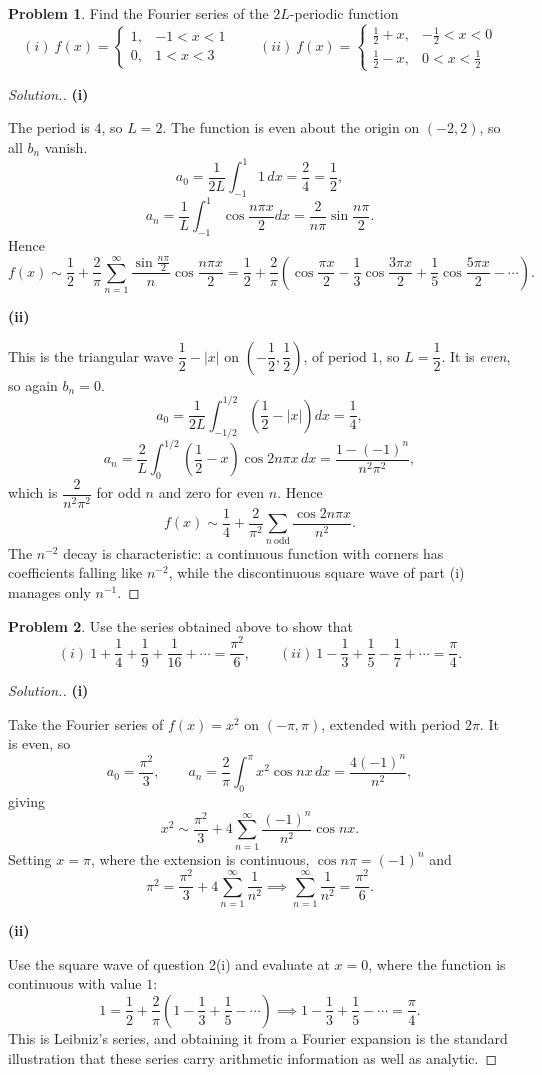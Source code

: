 \documentclass[11pt,a4paper]{article}
\theoremstyle{definition}
\newtheorem{problemx}{Problem}[subsection]
\newenvironment{problem}{\begin{problemx}}{\end{problemx}}
\newenvironment{solution}
  {\renewcommand{\qedsymbol}{}\begin{proof}[\textit{Solution}.]}
  {\end{proof}}
\newcommand{\subhead}[1]{%
  \par\medskip\noindent\textbf{#1}\par\nobreak\smallskip}
\begin{document}
\begin{problem}
Find the Fourier series of the $2L$-periodic function
\[(i)\ f(x) = \begin{cases}1, & -1<x<1\\ 0, & 1<x<3\end{cases}
\qquad
(ii)\ f(x) = \begin{cases}\frac12+x, & -\frac12<x<0\\
\frac12-x, & 0<x<\frac12\end{cases}\]
\end{problem}
\begin{solution}
\subhead{(i)}
The period is $4$, so $L = 2$. The function is even about the origin on
$(-2,2)$, so all $b_n$ vanish.
\[a_0 = \frac{1}{2L}\int_{-1}^{1}1\,dx = \frac{2}{4} = \frac12 ,\]
\[a_n = \frac1L\int_{-1}^{1}\cos\frac{n\pi x}{2}dx
= \frac{2}{n\pi}\sin\frac{n\pi}{2}.\]
Hence
\[f(x)\sim\frac12 + \frac{2}{\pi}\sum_{n=1}^{\infty}
\frac{\sin\frac{n\pi}{2}}{n}\cos\frac{n\pi x}{2}
= \frac12 + \frac{2}{\pi}\left(\cos\frac{\pi x}{2}
- \frac13\cos\frac{3\pi x}{2} + \frac15\cos\frac{5\pi x}{2} - \cdots\right).\]

\subhead{(ii)}
This is the triangular wave $\dfrac12-\left|x\right|$ on
$\left(-\dfrac12,\dfrac12\right)$, of period $1$, so $L = \dfrac12$. It is
\emph{even}, so again $b_n = 0$.
\[a_0 = \frac{1}{2L}\int_{-1/2}^{1/2}\left(\frac12-\left|x\right|\right)dx
= \frac14 ,\]
\[a_n = \frac{2}{L}\int_0^{1/2}\left(\frac12-x\right)\cos 2n\pi x\,dx
= \frac{1-(-1)^n}{n^2\pi^2},\]
which is $\dfrac{2}{n^2\pi^2}$ for odd $n$ and zero for even $n$. Hence
\[f(x)\sim\frac14 + \frac{2}{\pi^2}\sum_{n\ \text{odd}}
\frac{\cos 2n\pi x}{n^2}.\]
The $n^{-2}$ decay is characteristic: a continuous function with corners has
coefficients falling like $n^{-2}$, while the discontinuous square wave of part
(i) manages only $n^{-1}$.
\end{solution}

\begin{problem}
Use the series obtained above to show that
\[(i)\ 1+\frac14+\frac19+\frac{1}{16}+\cdots = \frac{\pi^2}{6},
\qquad
(ii)\ 1-\frac13+\frac15-\frac17+\cdots = \frac{\pi}{4}.\]
\end{problem}
\begin{solution}
\subhead{(i)}
Take the Fourier series of $f(x) = x^2$ on $(-\pi,\pi)$, extended with period
$2\pi$. It is even, so
\[a_0 = \frac{\pi^2}{3},\qquad
a_n = \frac{2}{\pi}\int_0^{\pi}x^2\cos nx\,dx = \frac{4(-1)^n}{n^2},\]
giving
\[x^2 \sim \frac{\pi^2}{3} + 4\sum_{n=1}^{\infty}\frac{(-1)^n}{n^2}\cos nx .\]
Setting $x = \pi$, where the extension is continuous, $\cos n\pi = (-1)^n$ and
\[\pi^2 = \frac{\pi^2}{3} + 4\sum_{n=1}^{\infty}\frac{1}{n^2}
\implies \sum_{n=1}^{\infty}\frac{1}{n^2} = \frac{\pi^2}{6}.\]

\subhead{(ii)}
Use the square wave of question 2(i) and evaluate at $x=0$, where the function
is continuous with value $1$:
\[1 = \frac12 + \frac{2}{\pi}\left(1-\frac13+\frac15-\cdots\right)
\implies 1-\frac13+\frac15-\cdots = \frac{\pi}{4}.\]
This is Leibniz's series, and obtaining it from a Fourier expansion is the
standard illustration that these series carry arithmetic information as well as
analytic.
\end{solution}
\end{document}
